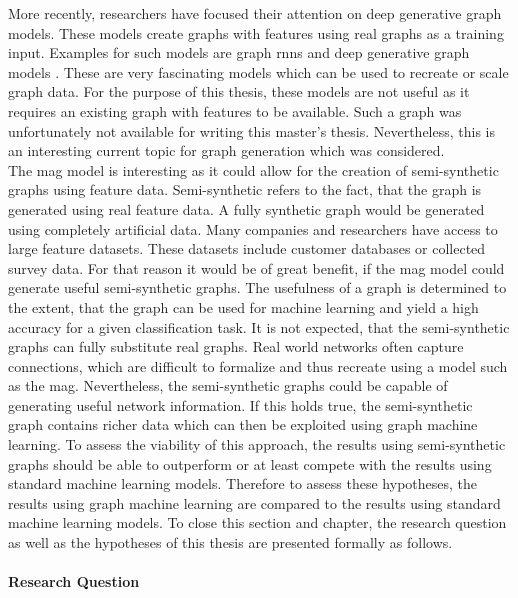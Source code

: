 	\noindent More recently, researchers have focused their attention on deep 
	generative graph models. These models create graphs with features using
	real graphs as a training input. Examples for such models are graph
	\aclp{rnn} \citep{you2018graphrnn} and deep generative graph
	models \citep{li2018learning}. These are very fascinating models which can
	be used to recreate or scale graph data. For the purpose of this thesis,
	these models are not useful as it requires an existing graph with
	features to be available. Such a graph was unfortunately not available for
	writing this master's thesis. Nevertheless, this is an interesting current 
	topic for graph generation which was considered. \\ 

	\noindent The \acs{mag} model is interesting as it could allow for the 
	creation of semi-synthetic graphs using feature data. Semi-synthetic refers
	to the fact, that the graph is generated using real feature data. A fully
	synthetic graph would be generated using completely artificial data. Many
	companies and researchers have access to large feature datasets. These
	datasets include customer databases or collected survey data. For that
	reason it would be of great benefit, if the \acs{mag} model could generate
	useful semi-synthetic graphs. The usefulness of a graph is determined to
	the extent, that the graph can be used for machine learning and yield a 
	high accuracy for a given classification task. It is not expected, that the 
	semi-synthetic graphs can fully substitute real graphs. Real world networks
	often capture connections, which are difficult to formalize and thus
	recreate using a model such as the \acs{mag}. Nevertheless, the
	semi-synthetic graphs could be capable of generating useful network
	information. If this holds true, the semi-synthetic graph contains richer
	data which can then be exploited using graph machine learning. To assess
	the viability of this approach, the results using semi-synthetic graphs
	should be able to outperform or at least compete with the results using
	standard machine learning models. Therefore to assess these hypotheses,
	the results using graph machine learning are compared to the results using 
	standard machine learning models. To close this section and chapter, the 
	research question as well as the hypotheses of this thesis are presented 
	formally as follows.
	\newpage
	\paragraph{Research Question}\mbox{}

